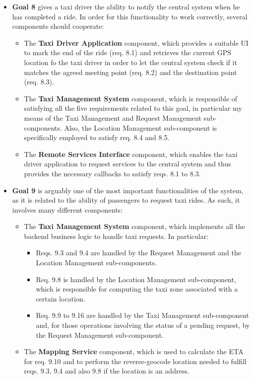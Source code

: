 \begin{itemize}
\begin{itemize}
	\end{itemize}
	\item \textbf{Goal 8} gives a taxi driver the ability to notify the central system when he has completed a ride. In order for this functionality to work correctly, several components should cooperate:
	\begin{itemize}
	\item The \textbf{Taxi Driver Application} component, which provides a suitable UI to mark the end of the ride (req. 8.1) and retrieves the current GPS location fo the taxi driver in order to let the central system check if it matches the agreed meeting point (req. 8.2) and the destination point (req. 8.3).
	\item The \textbf{Taxi Management System} component, which is responsible of satisfying all the five requirements related to this goal, in particular my means of the Taxi Management and Request Management sub-components. Also, the Location Management sub-component is specifically employed to satisfy req. 8.4 and 8.5.
	\item The \textbf{Remote Services Interface} component, which enables the taxi driver application to request services to the central system and thus provides the necessary callbacks to satisfy reqs. 8.1 to 8.3.
	\end{itemize}
	\item \textbf{Goal 9} is arguably one of the most important functionalities of the system, as it is related to the ability of passengers to request taxi rides. As such, it involves many different components:
	\begin{itemize}
		\item The \textbf{Taxi Management System} component, which implements all the backend business logic to handle taxi requests. In particular:
		\begin{itemize}
		\item Reqs. 9.3 and 9.4 are handled by the Request Management and the Location Management sub-components.
		\item Req. 9.8 is handled by the Location Management sub-component, which is responsible for computing the taxi zone associated with a certain location.
		\item Req. 9.9 to 9.16 are handled by the Taxi Management sub-component and, for those operations involving the status of a pending request, by the Request Management sub-component.
		\end{itemize}
		\item The \textbf{Mapping Service} component, which is used to calculate the ETA for req. 9.10 and to perform the reverse-geocode location needed to fulfill reqs. 9.3, 9.4 and also 9.8 if the location is an address.

\end{itemize}
\end{itemize}
